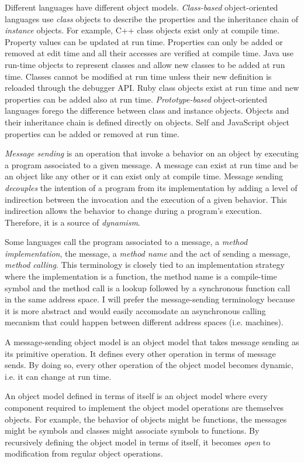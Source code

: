 Different languages have different object models. \textit{Class-based}
object-oriented languages use \textit{class} objects to describe the properties
and the inheritance chain of \textit{instance} objects. For example, C++ class
objects exist only at compile time. Property values can be updated at run time.
Properties can only be added or removed at edit time and all their accesses are
verified at compile time. Java use run-time objects to represent classes and
allow new classes to be added at run time.  Classes cannot be modified at run
time unless their new definition is reloaded through the debugger API. Ruby
class objects exist at run time and new properties can be added also at run
time. \textit{Prototype-based} object-oriented languages forego the difference
between class and instance objects. Objects and their inheritance chain is
defined directly on objects. Self and JavaScript object properties can be
added or removed at run time. 

\textit{Message sending} is an operation that invoke a behavior on an object by
executing a program associated to a given message.  A message can exist at run
time and be an object like any other or it can exist only at compile time.
Message sending \textit{decouples} the intention of a program from its
implementation by adding a level of indirection between the invocation and the
execution of a given behavior. This indirection allows the behavior to change
during a program's execution. Therefore, it is a source of \textit{dynamism}.

Some languages call the program associated to a message, a \textit{method
implementation}, the message, a \textit{method name} and the act of sending a
message, \textit{method calling}. This terminology is closely tied to an
implementation strategy where the implementation is a function, the method name
is a compile-time symbol and the method call is a lookup followed by a
synchronous function call in the same address space. I will prefer the
message-sending terminology because it is more abstract and would easily
accomodate an asynchronous calling mecanism that could happen between different
address spaces (i.e. machines). 

A message-sending object model is an object model that takes message sending as
its primitive operation. It defines every other operation in terms of message
sends. By doing so, every other operation of the object model becomes dynamic,
i.e. it can change at run time.

An object model defined in terms of itself is an object model where every
component required to implement the object model operations are themselves
objects. For example, the behavior of objects might be functions, the messages
might be symbols and classes might associate symbols to functions. By
recursively defining the object model in terms of itself, it becomes
\textit{open} to modification from regular object operations.


